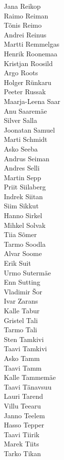\begin{multicols}{3}
Jana Reikop\\
Raimo Reiman\\
Tõnis Reimo\\
Andrei Reinus\\
Martti Remmelgas\\
Henrik Roonemaa\\
Kristjan Roosild\\
Argo Roots\\
Holger Rünkaru\\
Peeter Russak\\
Maarja-Leena Saar\\
Anu Saaremäe\\
Silver Salla\\
Joonatan Samuel\\
Marti Schmidt\\
Asko Seeba\\
Andrus Seiman\\
Andres Selli\\
Martin Sepp\\
Priit Siilaberg\\
Indrek Siitan\\
Siim Sikkut\\
Hanno Sirkel\\
Mihkel Solvak\\
Tiia Sõmer\\
Tarmo Soodla\\
Alvar Soome\\
Erik Suit\\
Urmo Sutermäe\\
Enn Sutting\\
Vladimir Šor\\
Ivar Zarans\\
Kalle Tabur\\
Gristel Tali\\
Tarmo Tali\\
Sten Tamkivi\\
Taavi Tamkivi\\
Asko Tamm\\
Taavi Tamm\\
Kalle Tammemäe\\
Taavi Tänavsuu\\
Lauri Tarend\\
Villu Teearu\\
Janno Teelem\\
Hasso Tepper\\
Taavi Tiirik\\
Marek Tiits\\
Tarko Tikan\\

\end{multicols}
